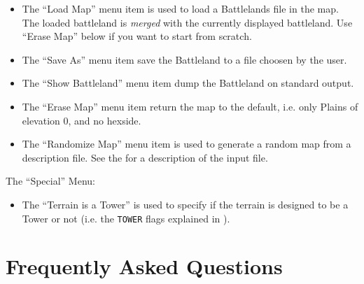 \documentclass{article}
\begin{document}
\begin{itemize}

\item The ``Load Map'' menu item is used to load a Battlelands 
file in the map. The loaded battleland is \emph{merged}
with the currently displayed battleland. Use ``Erase Map''
below if you want to start from scratch.

\item The ``Save As'' menu item save the Battleland to a
file choosen by the user.

\item The ``Show Battleland'' menu item dump the Battleland
on standard output.

\item The ``Erase Map'' menu item return the map to the
default, i.e. only Plains of elevation 0, and no
hexside.

\item The ``Randomize Map'' menu item is used to generate
a random map from a description file. See the
for a description of the input file.

\end{itemize}

The ``Special'' Menu:

\begin{itemize}

\item The ``Terrain is a Tower'' is used to specify if the terrain is designed to be a Tower or not (i.e. the \texttt{TOWER} flags explained in ).

\end{itemize}

\section{Frequently Asked Questions}
\end{document}
